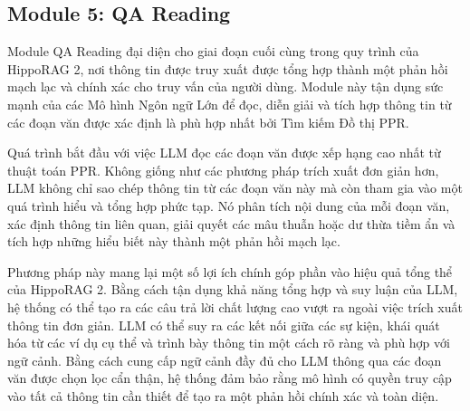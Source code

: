\documentclass[../main.tex]{subfiles}
\begin{document}
\subsection{Module 5: QA Reading}
Module QA Reading đại diện cho giai đoạn cuối cùng trong quy trình của HippoRAG 2, nơi thông tin được truy xuất được tổng hợp thành một phản hồi mạch lạc và chính xác cho truy vấn của người dùng. Module này tận dụng sức mạnh của các Mô hình Ngôn ngữ Lớn để đọc, diễn giải và tích hợp thông tin từ các đoạn văn được xác định là phù hợp nhất bởi Tìm kiếm Đồ thị PPR.

Quá trình bắt đầu với việc LLM đọc các đoạn văn được xếp hạng cao nhất từ thuật toán PPR. Không giống như các phương pháp trích xuất đơn giản hơn, LLM không chỉ sao chép thông tin từ các đoạn văn này mà còn tham gia vào một quá trình hiểu và tổng hợp phức tạp. Nó phân tích nội dung của mỗi đoạn văn, xác định thông tin liên quan, giải quyết các mâu thuẫn hoặc dư thừa tiềm ẩn và tích hợp những hiểu biết này thành một phản hồi mạch lạc.

Phương pháp này mang lại một số lợi ích chính góp phần vào hiệu quả tổng thể của HippoRAG 2. Bằng cách tận dụng khả năng tổng hợp và suy luận của LLM, hệ thống có thể tạo ra các câu trả lời chất lượng cao vượt ra ngoài việc trích xuất thông tin đơn giản. LLM có thể suy ra các kết nối giữa các sự kiện, khái quát hóa từ các ví dụ cụ thể và trình bày thông tin một cách rõ ràng và phù hợp với ngữ cảnh. Bằng cách cung cấp ngữ cảnh đầy đủ cho LLM thông qua các đoạn văn được chọn lọc cẩn thận, hệ thống đảm bảo rằng mô hình có quyền truy cập vào tất cả thông tin cần thiết để tạo ra một phản hồi chính xác và toàn diện.


\end{document}
